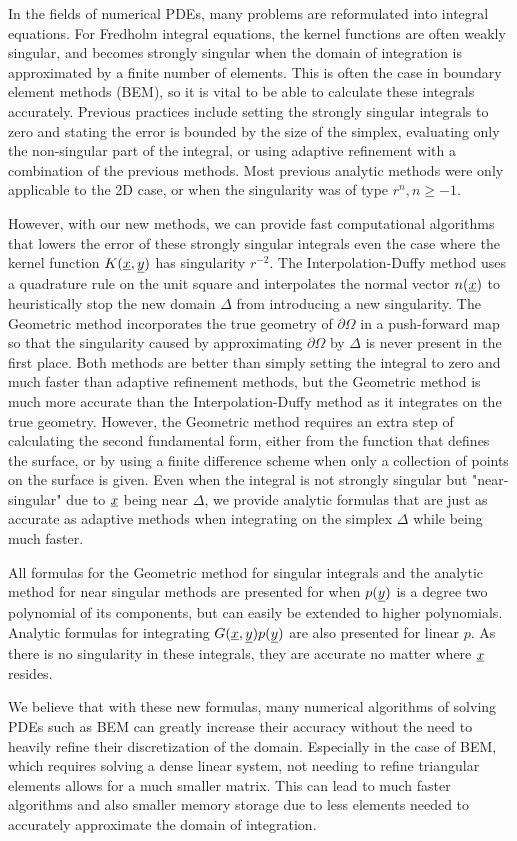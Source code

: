 \documentclass[../paper.tex]{subfiles}
\begin{document}
In the fields of numerical PDEs, many problems are reformulated into integral equations. For Fredholm integral equations, the kernel functions are often weakly singular, and becomes strongly singular when the domain of integration is approximated by a finite number of elements. This is often the case in boundary element methods (BEM), so it is vital to be able to calculate these integrals accurately. Previous practices include setting the strongly singular integrals to zero and stating the error is bounded by the size of the simplex, evaluating only the non-singular part of the integral, or using adaptive refinement with a combination of the previous methods. Most previous analytic methods were only applicable to the 2D case, or when the singularity was of type $r^n, n\geq -1$.

However, with our new methods, we can provide fast computational algorithms that lowers the error of these strongly singular integrals even the case where the kernel function $K(\underline{x}, \underline{y})$ has singularity $r^{-2}$.
The Interpolation-Duffy method uses a quadrature rule on the unit square and interpolates the normal vector $n(\underline{x})$ to heuristically stop the new domain $\Delta$ from introducing a new singularity. 
The Geometric method incorporates the true geometry of $\partial\Omega$ in a push-forward map so that the singularity caused by approximating $\partial\Omega$ by $\Delta$ is never present in the first place.
Both methods are better than simply setting the integral to zero and much faster than adaptive refinement methods, but the Geometric method is much more accurate than the Interpolation-Duffy method as it integrates on the true geometry. 
However, the Geometric method requires an extra step of calculating the second fundamental form, either from the function that defines the surface, or by using a finite difference scheme when only a collection of points on the surface is given.
Even when the integral is not strongly singular but "near-singular" due to $\underline{x}$ being near $\Delta$, we provide analytic formulas that are just as accurate as adaptive methods when integrating on the simplex $\Delta$ while being much faster. 

All formulas for the Geometric method for singular integrals and the analytic method for near singular methods are presented for when $p(\underline{y})$ is a degree two polynomial of its components, but can easily be extended to higher polynomials.
Analytic formulas for integrating $G(\underline{x}, \underline{y})p(\underline{y})$ are also presented for linear $p$. As there is no singularity in these integrals, they are accurate no matter where $\underline{x}$ resides.

We believe that with these new formulas, many numerical algorithms of solving PDEs such as BEM \cite{ramvsak20073d, ren2015analytical, bohm2024efficient, atkinson1997numerical} can greatly increase their accuracy without the need to heavily refine their discretization of the domain. Especially in the case of BEM, which requires solving a dense linear system, not needing to refine triangular elements allows for a much smaller matrix. This can lead to much faster algorithms and also smaller memory storage due to less elements needed to accurately approximate the domain of integration. 
\end{document}
